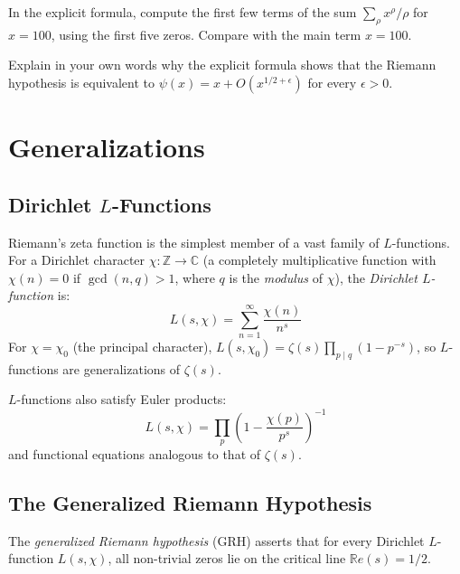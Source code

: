 \begin{exercise}
\label{ex:explicit_terms}
In the explicit formula, compute the first few terms of the sum $\sum_{\rho} x^{\rho}/\rho$ for $x = 100$, using the first five zeros. Compare with the main term $x = 100$.
\end{exercise}

\begin{exercise}
\label{ex:rh_equivalence}
Explain in your own words why the explicit formula shows that the Riemann hypothesis is equivalent to $\psi(x) = x + O(x^{1/2 + \epsilon})$ for every $\epsilon > 0$.
\end{exercise}

\section{Generalizations}
\label{sec:generalizations}

\subsection{Dirichlet $L$-Functions}

Riemann's zeta function is the simplest member of a vast family of $L$-functions. For a Dirichlet character $\chi: \mathbb{Z} \to \mathbb{C}$ (a completely multiplicative function with $\chi(n) = 0$ if $\gcd(n, q) > 1$, where $q$ is the \textit{modulus} of $\chi$), the \textit{Dirichlet $L$-function} is:
\[
L(s, \chi) = \sum_{n=1}^{\infty} \frac{\chi(n)}{n^s}
\]
For $\chi = \chi_0$ (the principal character), $L(s, \chi_0) = \zeta(s) \prod_{p \mid q} (1 - p^{-s})$, so $L$-functions are generalizations of $\zeta(s)$.

$L$-functions also satisfy Euler products:
\[
L(s, \chi) = \prod_p \left(1 - \frac{\chi(p)}{p^s}\right)^{-1}
\]
and functional equations analogous to that of $\zeta(s)$.

\subsection{The Generalized Riemann Hypothesis}

\begin{definition}
The \textit{generalized Riemann hypothesis} (GRH) asserts that for every Dirichlet $L$-function $L(s, \chi)$, all non-trivial zeros lie on the critical line $\mathbb{R}e(s) = 1/2$.
\end{definition}

